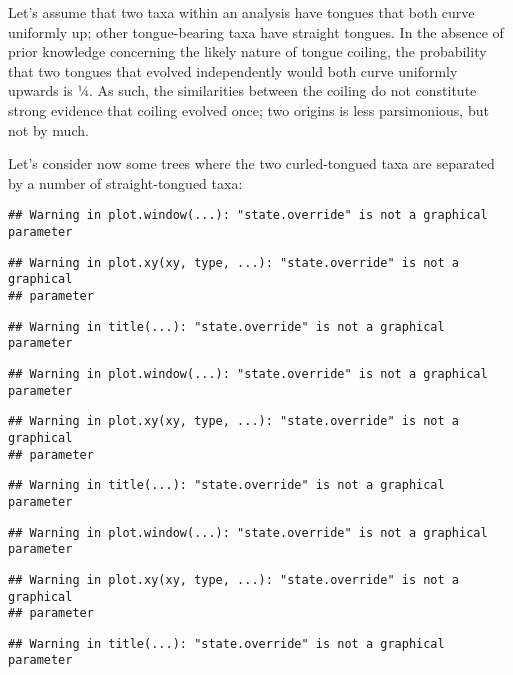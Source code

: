 \documentclass[]{book}
\theoremstyle{definition}
\theoremstyle{definition}
\theoremstyle{definition}
\theoremstyle{remark}
\begin{document}
Let's assume that two taxa within an analysis have tongues that both
curve uniformly up; other tongue-bearing taxa have straight tongues. In
the absence of prior knowledge concerning the likely nature of tongue
coiling, the probability that two tongues that evolved independently
would both curve uniformly upwards is ¼. As such, the similarities
between the coiling do not constitute strong evidence that coiling
evolved once; two origins is less parsimonious, but not by much.

Let's consider now some trees where the two curled-tongued taxa are
separated by a number of straight-tongued taxa:

\begin{verbatim}
## Warning in plot.window(...): "state.override" is not a graphical parameter
\end{verbatim}

\begin{verbatim}
## Warning in plot.xy(xy, type, ...): "state.override" is not a graphical
## parameter
\end{verbatim}

\begin{verbatim}
## Warning in title(...): "state.override" is not a graphical parameter
\end{verbatim}

\begin{verbatim}
## Warning in plot.window(...): "state.override" is not a graphical parameter
\end{verbatim}

\begin{verbatim}
## Warning in plot.xy(xy, type, ...): "state.override" is not a graphical
## parameter
\end{verbatim}

\begin{verbatim}
## Warning in title(...): "state.override" is not a graphical parameter
\end{verbatim}

\begin{verbatim}
## Warning in plot.window(...): "state.override" is not a graphical parameter
\end{verbatim}

\begin{verbatim}
## Warning in plot.xy(xy, type, ...): "state.override" is not a graphical
## parameter
\end{verbatim}

\begin{verbatim}
## Warning in title(...): "state.override" is not a graphical parameter
\end{verbatim}
\end{document}

